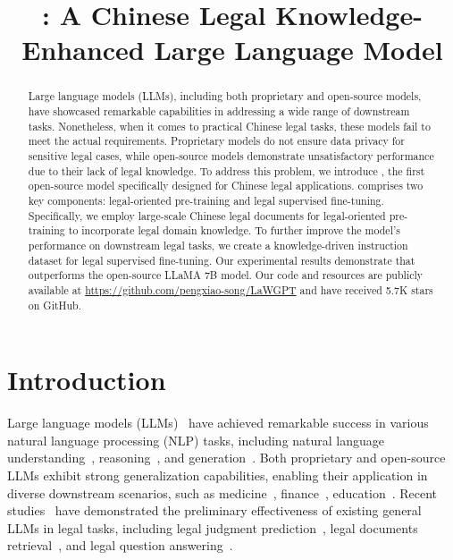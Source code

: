 \title{\algo: A Chinese Legal Knowledge-Enhanced Large Language Model}



\maketitle

\begin{abstract}
  Large language models (LLMs), including both proprietary and open-source models, have showcased remarkable capabilities in addressing a wide range of downstream tasks. 
  Nonetheless, when it comes to practical Chinese legal tasks, these models fail to meet the actual requirements. 
  Proprietary models do not ensure data privacy for sensitive legal cases, while open-source models demonstrate unsatisfactory performance due to their lack of legal knowledge. 
  To address this problem, we introduce \algo, the first open-source model specifically designed for Chinese legal applications. 
  \algo comprises two key components: legal-oriented pre-training and legal supervised fine-tuning. 
  Specifically, we employ large-scale Chinese legal documents for legal-oriented pre-training to incorporate legal domain knowledge. 
  To further improve the model's performance on downstream legal tasks, we create a knowledge-driven instruction dataset for legal supervised fine-tuning. 
  Our experimental results demonstrate that \algo outperforms the open-source LLaMA 7B model. 
  Our code and resources are publicly available at \url{https://github.com/pengxiao-song/LaWGPT} and have received 5.7K stars on GitHub.
\end{abstract}

\section{Introduction}
\label{sec:introduction}

Large language models (LLMs)~\citep{GPT4,hugo23LLaMA2} have achieved remarkable success in various natural language processing (NLP) tasks, including natural language understanding~\citep{dong19understanding}, reasoning~\citep{DBLP:conf/acl/0009C23}, and generation~\citep{yu22text}. 
Both proprietary and open-source LLMs exhibit strong generalization capabilities, enabling their application in diverse downstream scenarios, such as medicine~\citep{th23medicine}, finance~\citep{DBLP:journals/corr/abs-2306-06031}, education~\citep{DBLP:conf/bigdataconf/GanQWL23}. 
Recent studies~\citep{li2023LawBench,nguyen2023LawGPT} have demonstrated the preliminary effectiveness of existing general LLMs in legal tasks, including legal judgment prediction~\citep{luo2017legalpredict}, legal documents retrieval~\citep{chen2013textmining}, and legal question answering~\citep{zhong2020nlpbenefit}. 


